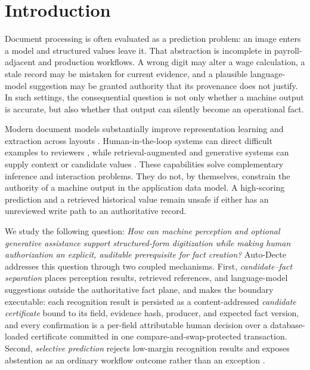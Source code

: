 \section{Introduction}
\label{sec:introduction}

Document processing is often evaluated as a prediction problem: an image enters a model and structured values leave it. That abstraction is incomplete in payroll-adjacent and production workflows. A wrong digit may alter a wage calculation, a stale record may be mistaken for current evidence, and a plausible language-model suggestion may be granted authority that its provenance does not justify. In such settings, the consequential question is not only whether a machine output is accurate, but also whether that output can silently become an operational fact.

Modern document models substantially improve representation learning and extraction across layouts \citep{layoutlm,layoutlmv2,layoutlmv3,donut,docformer,trocr}. Human-in-the-loop systems can direct difficult examples to reviewers \citep{budd2021,mosqueira2023}, while retrieval-augmented and generative systems can supply context or candidate values \citep{gao2023,xu2024}. These capabilities solve complementary inference and interaction problems. They do not, by themselves, constrain the authority of a machine output in the application data model. A high-scoring prediction and a retrieved historical value remain unsafe if either has an unreviewed write path to an authoritative record.

We study the following question: \emph{How can machine perception and optional generative assistance support structured-form digitization while making human authorization an explicit, auditable prerequisite for fact creation?} Auto-Decte addresses this question through two coupled mechanisms. First, \emph{candidate--fact separation} places perception results, retrieved references, and language-model suggestions outside the authoritative fact plane, and makes the boundary executable: each recognition result is persisted as a content-addressed \emph{candidate certificate} bound to its field, evidence hash, producer, and expected fact version, and every confirmation is a per-field attributable human decision over a database-loaded certificate committed in one compare-and-swap-protected transaction. Second, \emph{selective prediction} rejects low-margin recognition results and exposes abstention as an ordinary workflow outcome rather than an exception \citep{chow1970,geifman2017,geifman2019}.

